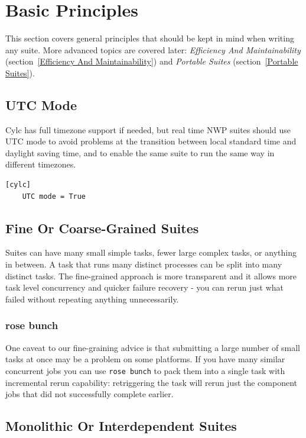 \section{Basic Principles}
\label{Basic Principles}

This section covers general principles that should be kept in mind when writing
any suite. More advanced topics are covered later: {\em Efficiency And
Maintainability} (section~\ref{Efficiency And Maintainability}) and {\em
Portable Suites} (section~\ref{Portable Suites}).

\subsection{UTC Mode}

Cylc has full timezone support if needed, but real time NWP suites should use
UTC mode to avoid problems at the transition between local standard time and
daylight saving time, and to enable the same suite to run the same way in
different timezones.

\lstset{language=suiterc}
\begin{lstlisting}
[cylc]
    UTC mode = True
\end{lstlisting}
\subsection{Fine Or Coarse-Grained Suites}

Suites can have many small simple tasks, fewer large complex tasks, or anything
in between. A task that runs many distinct processes can be split into many
distinct tasks. The fine-grained approach is more transparent and it allows
more task level concurrency and quicker failure recovery - you can rerun just
what failed without repeating anything unnecessarily.

\subsubsection{rose bunch}

One caveat to our fine-graining advice is that submitting a large number of
small tasks at once may be a problem on some platforms. If you have many
similar concurrent jobs you can use \lstinline=rose bunch= to pack them into a
single task with incremental rerun capability: retriggering the task will rerun
just the component jobs that did not successfully complete earlier.

\subsection{Monolithic Or Interdependent Suites}
\label{Monolithic Or Interdependent Suites}

